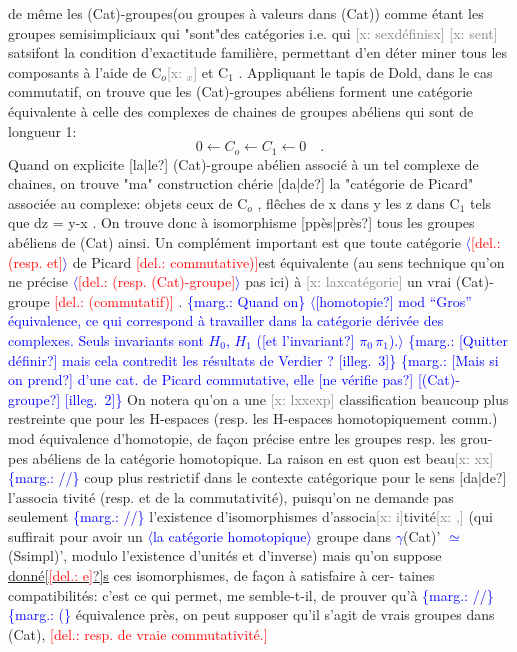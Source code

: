 \documentclass[11pt]{article}
\newcommand{\hand}[1]{\textcolor{blue}{#1}}
\newcommand{\inserted}[2][]{\textcolor{blue}{$\langle$#2$\rangle$}}
\newcommand{\margin}[1]{\textcolor{blue}{\{\textsf{marg.:} #1\}}}
\newcommand{\deleted}[1]{\textcolor{red}{[\textsf{del.:} #1]}}
\newcommand{\xout}[1]{\textcolor{gray}{[\textsf{x:} #1]}}
\newcommand{\uline}[1]{\underline{#1}}
\newcommand{\unsure}[1]{[#1?]}
\newcommand{\illegible}[1]{[\textsf{illeg.\ #1}]}
\begin{document}
de même les (Cat)-groupes(ou groupes à valeurs dans (Cat)) comme étant
les groupes semisimpliciaux qui "sont"des catégories i.e. qui \xout{sexdéfinisx}
\xout{sent} satsifont la condition d'exactitude familière, permettant d'en déter
miner tous les composants à l'aide de C$_{o}$\xout{$_{x}$} et C$_{1}$ . Appliquant le tapis de
Dold, dans le cas commutatif, on trouve que les (Cat)-groupes abéliens
forment une catégorie équivalente à celle des complexes de chaines de
groupes abéliens qui sont de longueur 1:
\[ 0 \leftarrow C_{o} \leftarrow C_{1} \leftarrow 0 \quad . \]
Quand on explicite \unsure{la|le} (Cat)-groupe abélien associé à un tel complexe de
chaines, on trouve "ma" construction chérie \unsure{da|de} la "catégorie de Picard"
associée au complexe: objets ceux de C$_{o}$ , flêches de x dans y les z dans C$_{1}$
tels que dz = y-x . On trouve donc à isomorphisme \unsure{ppès|près} tous les groupes
abéliens de (Cat) ainsi. Un complément important est que toute catégorie
\inserted[typed]{\deleted{(resp. et}}
de Picard \deleted{commutative)}est équivalente (au sens technique qu'on ne précise
\inserted[typed]{\deleted{(resp. (Cat)-groupe}}
pas ici) à \xout{laxcatégorie} un vrai (Cat)-groupe \deleted{(commutatif)} . \margin{Quand on}
\inserted{\unsure{homotopie} mod ``Gros'' équivalence, ce qui correspond à travailler dans la catégorie dérivée des complexes. Seuls invariants sont $H_0$, $H_1$ (\unsure{et l'invariant} $\pi_0\,\pi_1$).}
\margin{\unsure{Quitter définir} mais cela contredit les résultats de Verdier ? \illegible{3}}
\margin{\unsure{Mais si on prend} d'une cat. de Picard commutative, elle \unsure{ne vérifie pas} \unsure{(Cat)-groupe} \illegible{2}}
On notera qu'on a une \xout{lxxexp} classification beaucoup plus restreinte
que pour les H-espaces (resp. les H-espaces homotopiquement comm.) mod
équivalence d'homotopie, de façon précise entre les groupes resp. les grou-%
pes abéliens de la catégorie homotopique. La raison en est quon est beau\xout{xx}
\margin{//} coup plus restrictif dans le contexte catégorique pour le sens \unsure{da|de} l'associa
tivité (resp. et de la commutativité), puisqu'on ne demande pas seulement \margin{//}
l'existence d'isomorphismes d'associa\xout{i}tivité\xout{,} (qui suffirait pour avoir un
\inserted[typed]{la catégorie homotopique}
groupe dans \hand{$\gamma$}(Cat)' \hand{$\simeq$} (Ssimpl)', modulo l'existence d'unités et d'inverse)
mais qu'on suppose \uline{donné\unsure{\deleted{e}}s} ces isomorphismes, de façon à satisfaire à cer-%
taines compatibilités: c'est ce qui permet, me semble-t-il, de prouver qu'à
\margin{//} \margin{(} équivalence près, on peut supposer qu'il s'agit de vrais groupes dans
(Cat), \deleted{resp. de vraie commutativité.}
\end{document}
